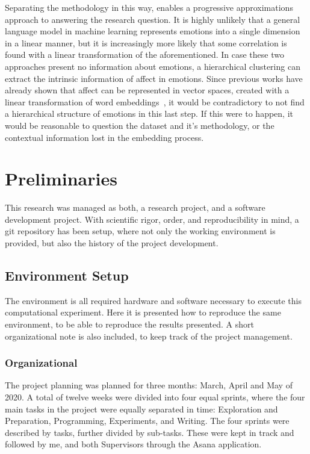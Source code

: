 Separating the methodology in this way, enables a progressive approximations approach to answering the research question. It is highly unlikely that a general language model in machine learning represents emotions into a single dimension in a linear manner, but it is increasingly more likely that some correlation is found with a linear transformation of the aforementioned. In case these two approaches present no information about emotions, a hierarchical clustering can extract the intrinsic information of affect in emotions. Since previous works have already shown that affect can be represented in vector spaces, created with a linear transformation of word embeddings~\cite{hollis2016principals}, it would be contradictory to not find a hierarchical structure of emotions in this last step. If this were to happen, it would be reasonable to question the dataset and it's methodology, or the contextual information lost in the embedding process.

\section{Preliminaries}\label{sec:Preliminaries}
This research was managed as both, a research project, and a software development project.
With scientific rigor, order, and reproducibility in mind, a git repository has been setup, where not only the working environment is provided, but also the history of the project  development.

\subsection{Environment Setup}\label{sub:Environment Setup}
The environment is all required hardware and software necessary to execute this computational experiment. Here it is presented how to reproduce the same environment, to be able to reproduce the results presented. A short organizational note is also included, to keep track of the project management.

\subsubsection{Organizational}\label{subs:Organizational}
The project planning was planned for three months: March, April and May of 2020. A total of twelve weeks were divided into four equal sprints, where the four main tasks in the project were equally separated in time: Exploration and Preparation, Programming, Experiments, and Writing. The four sprints were described by tasks, further divided by sub-tasks. These were kept in track and followed by me, and both Supervisors through the Asana application.

